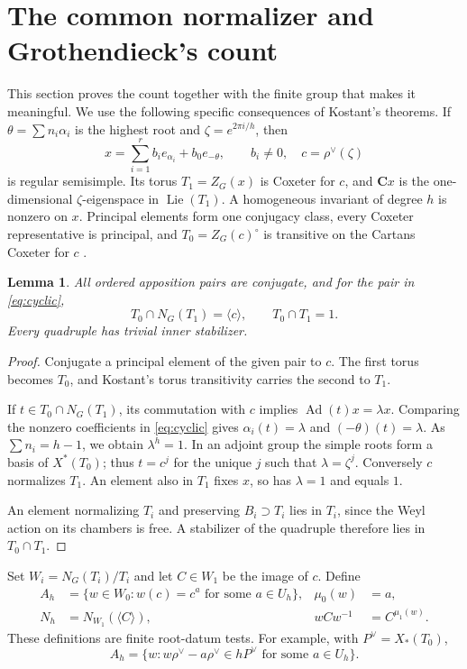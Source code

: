 \documentclass[11pt]{article}
\newcommand{\C}{\mathbf C}\newcommand{\Z}{\mathbf Z}\newcommand{\Q}{\mathbf Q}
\newcommand{\Ad}{\operatorname{Ad}}\newcommand{\Aut}{\operatorname{Aut}}
\newcommand{\Lie}{\operatorname{Lie}}\newcommand{\GL}{\operatorname{GL}}
\newtheorem{lemma}[theorem]{Lemma}
\theoremstyle{definition}\newtheorem{definition}[theorem]{Definition}
\theoremstyle{remark}\newtheorem{remark}[theorem]{Remark}
\begin{document}
\section{The common normalizer and Grothendieck's count}\label{sec:count}
This section proves the count together with the finite group that makes it meaningful. We use the following specific consequences of Kostant's theorems. If $\theta=\sum n_i\alpha_i$ is the highest root and $\zeta=e^{2\pi i/h}$, then
\begin{equation}\label{eq:cyclic}
 x=\sum_{i=1}^r b_i e_{\alpha_i}+b_0e_{-\theta},\qquad b_i\ne0,
 \quad c=\rho^\vee(\zeta)
\end{equation}
is regular semisimple. Its torus $T_1=Z_G(x)$ is Coxeter for $c$, and $\C x$ is the one-dimensional $\zeta$-eigenspace in $\Lie(T_1)$. A homogeneous invariant of degree $h$ is nonzero on $x$. Principal elements form one conjugacy class, every Coxeter representative is principal, and $T_0=Z_G(c)^\circ$ is transitive on the Cartans Coxeter for $c$ \citep[Proposition~1.1, Theorems~1.2--1.4, and Theorem~1.9, pp.~5--8]{Kostant2010}.

\begin{lemma}\label{lem:rigidity}
All ordered apposition pairs are conjugate, and for the pair in \eqref{eq:cyclic},
\[
 T_0\cap N_G(T_1)=\langle c\rangle,\qquad T_0\cap T_1=1.
\]
Every quadruple has trivial inner stabilizer.
\end{lemma}
\begin{proof}
Conjugate a principal element of the given pair to $c$. The first torus becomes $T_0$, and Kostant's torus transitivity carries the second to $T_1$.

If $t\in T_0\cap N_G(T_1)$, its commutation with $c$ implies $\Ad(t)x=\lambda x$. Comparing the nonzero coefficients in \eqref{eq:cyclic} gives $\alpha_i(t)=\lambda$ and $(-\theta)(t)=\lambda$. As $\sum n_i=h-1$, we obtain $\lambda^h=1$. In an adjoint group the simple roots form a basis of $X^*(T_0)$; thus $t=c^j$ for the unique $j$ such that $\lambda=\zeta^j$. Conversely $c$ normalizes $T_1$. An element also in $T_1$ fixes $x$, so has $\lambda=1$ and equals $1$.

An element normalizing $T_i$ and preserving $B_i\supset T_i$ lies in $T_i$, since the Weyl action on its chambers is free. A stabilizer of the quadruple therefore lies in $T_0\cap T_1$.
\end{proof}

Set $W_i=N_G(T_i)/T_i$ and let $C\in W_1$ be the image of $c$. Define
\begin{align*}
 A_h&=\{w\in W_0:w(c)=c^a\text{ for some }a\in U_h\},
 &\mu_0(w)&=a,\\
 N_h&=N_{W_1}(\langle C\rangle),
 &wCw^{-1}&=C^{\mu_1(w)}.
\end{align*}
These definitions are finite root-datum tests. For example, with $P^\vee=X_*(T_0)$,
\[
 A_h=\{w:w\rho^\vee-a\rho^\vee\in hP^\vee\text{ for some }a\in U_h\}.
\]
\end{document}

